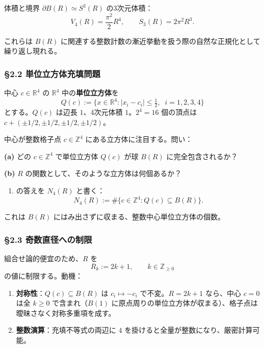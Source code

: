 \documentclass[a4paper,11pt]{ltjsarticle}
\theoremstyle{definition}
\providecommand{\tightlist}{\setlength{\itemsep}{0pt}\setlength{\parskip}{0pt}}
\begin{document}
体積と境界 \(\partial B(R) \simeq S^3(R)\) の3次元体積：
\[V_4(R) = \frac{\pi^2}{2} R^4, \qquad S_3(R) = 2\pi^2 R^3.\]

これらは \(B(R)\)
に関連する整数計数の漸近挙動を扱う際の自然な正規化として繰り返し現れる。

\subsubsection{§2.2
単位立方体充填問題}\label{ux5358ux4f4dux7acbux65b9ux4f53ux5145ux586bux554fux984c}

中心 \(c \in \mathbb{R}^4\) の \(\mathbb{R}^4\)
中の\textbf{単位立方体}を
\[Q(c) := \{x \in \mathbb{R}^4 : |x_i - c_i| \le \tfrac{1}{2}, \;\; i = 1, 2, 3, 4\}\]
とする。\(Q(c)\) は辺長 \(1\)、4次元体積 \(1\)。\(2^4 = 16\) 個の頂点は
\(c + (\pm 1/2, \pm 1/2, \pm 1/2, \pm 1/2)\)。

中心が整数格子点 \(c \in \mathbb{Z}^4\) にある立方体に注目する。問い：

\textbf{(a)} どの \(c \in \mathbb{Z}^4\) で単位立方体 \(Q(c)\) が球
\(B(R)\) に完全包含されるか？

\textbf{(b)} \(R\) の関数として、そのような立方体は何個あるか？

\begin{enumerate}
\def\labelenumi{(\alph{enumi})}
\setcounter{enumi}{1}
\tightlist
\item
  の答えを \(N_4(R)\) と書く：
  \[N_4(R) := \#\{c \in \mathbb{Z}^4 : Q(c) \subseteq B(R)\}.\]
\end{enumerate}

これは \(B(R)\) にはみ出さずに収まる、整数中心単位立方体の個数。

\subsubsection{§2.3
奇数直径への制限}\label{ux5947ux6570ux76f4ux5f84ux3078ux306eux5236ux9650}

組合せ論的便宜のため、\(R\) を
\[R_k := 2k + 1, \qquad k \in \mathbb{Z}_{\ge 0}\]
の値に制限する。動機：

\begin{enumerate}
\def\labelenumi{\arabic{enumi}.}
\item
  \textbf{対称性}：\(Q(c) \subseteq B(R)\) は \(c_i \mapsto -c_i\)
  で不変。\(R = 2k+1\) なら、中心 \(c = 0\) は全 \(k \ge 0\)
  で含まれ（\(B(1)\)
  に原点周りの単位立方体が収まる）、格子点は曖昧さなく対称多重項を成す。
\item
  \textbf{整数演算}：充填不等式の両辺に \(4\)
  を掛けると全量が整数になり、厳密計算可能。
\end{enumerate}
\end{document}
